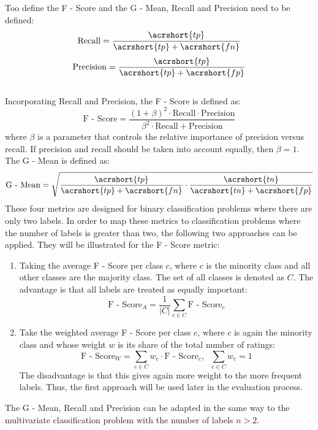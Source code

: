 Too define the F - Score and the G - Mean, Recall and Precision need to be defined:\\
\begin{equation}
    \text{Recall} = \frac{\acrshort{tp}}{\acrshort{tp} + \acrshort{fn}}
\end{equation}
\begin{equation}
    \text{Precision} = \frac{\acrshort{tp}}{\acrshort{tp} + \acrshort{fp}}
\end{equation}\\
Incorporating Recall and Precision, the F - Score is defined as:\\
\begin{equation}
    \text{F - Score} = \frac{(1 + \beta)^{2} \cdot \text{Recall} \cdot \text{Precision}}{\beta^{2} \cdot \text{Recall} + \text{Precision}}
\end{equation}
where $\beta$ is a parameter that controls the relative importance of precision versus recall. If precision and recall should be taken into account equally, then $\beta = 1$.\\
The G - Mean is defined as:\\
\begin{equation}
    \text{G - Mean} = \sqrt{\frac{\acrshort{tp}}{\acrshort{tp} + \acrshort{fn}} \cdot \frac{\acrshort{tn}}{\acrshort{tn} + \acrshort{fp}}}
\end{equation}
These four metrics are designed for binary classification problems where there are only two labels. In order to map these metrics to classification problems where the number of labels is greater than two, the following two approaches can be applied. They will be illustrated for the F - Score metric:
\begin{enumerate}
    \item Taking the average F - Score per class $c$, where $c$ is the minority class and all other classes are the majority class. The set of all classes is denoted as $C$. The advantage is that all labels are treated as equally important:
    \begin{equation}
        \text{F - Score}_A = \frac{1}{|C|}\sum_{c \in C} \text{F - Score}_c
    \end{equation}
    \item Take the weighted average F - Score per class $c$, where $c$ is again the minority class and whose weight $w$ is its share of the total number of ratings:
    \begin{equation}
        \text{F - Score}_W = \sum_{c \in C} w_c \cdot \text{F - Score}_c , \;\;\sum_{c \in C} w_c = 1
    \end{equation}
    The disadvantage is that this gives again more weight to the more frequent labels. Thus, the first approach will be used later in the evaluation process.
\end{enumerate}
The G - Mean, Recall and Precision can be adapted in the same way to the multivariate classification problem with the number of labels $n > 2$. 

